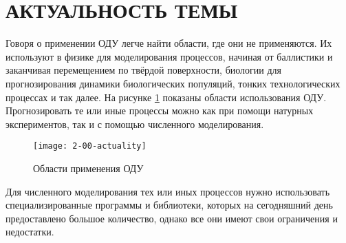 \section{АКТУАЛЬНОСТЬ ТЕМЫ}
Говоря о применении ОДУ легче найти области, где они не применяются.
Их используют в физике для моделирования процессов, начиная от баллистики и заканчивая перемещением
по твёрдой поверхности, биологии для прогнозирования динамики биологических популяций, тонких технологических процессах и так далее.
На рисунке \ref{fig:actuality} показаны области использования ОДУ.
Прогнозировать те или иные процессы можно как при помощи натурных экспериментов, так и с помощью численного моделирования.

\begin{figure}
    \texttt{[image: 2-00-actuality]}
    \caption{Области применения ОДУ}
    \label{fig:actuality}
\end{figure}

Для численного моделирования тех или иных процессов нужно использовать специализированные программы и библиотеки, которых на
сегодняшний день предоставлено большое количество, однако все они имеют свои ограничения и недостатки.
